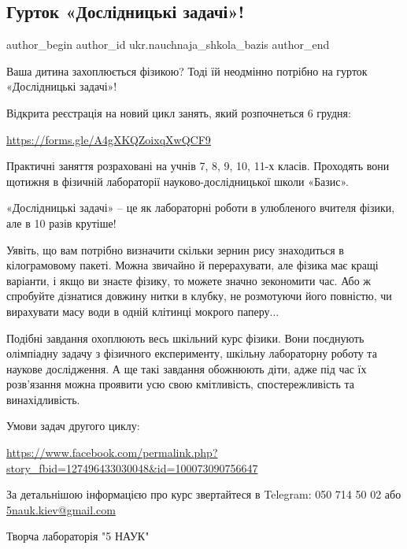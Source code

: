  
 
 
 
 
 
\subsection{Гурток «Дослідницькі задачі»!}
\label{sec:21_11_2021.fb.ukr.nauchnaja_shkola_bazis.1.gurtok_zadachi}
 
\ifcmt
 author_begin
   author_id ukr.nauchnaja_shkola_bazis
 author_end
\fi

Ваша дитина захоплюється фізикою? Тоді їй неодмінно потрібно на гурток
«Дослідницькі задачі»!

Відкрита реєстрація на новий цикл занять, який розпочнеться 6 грудня:

\url{https://forms.gle/A4gXKQZoixqXwQCF9}

Практичні заняття розраховані на учнів 7, 8, 9, 10, 11-х класів. Проходять вони
щотижня в фізичній лабораторії науково-дослідницької школи «Базис». 


«Дослідницькі задачі» – це як лабораторні роботи в улюбленого вчителя фізики,
але в 10 разів крутіше!

Уявіть, що вам потрібно визначити скільки зернин рису знаходиться в
кілограмовому пакеті. Можна звичайно й перерахувати, але фізика має кращі
варіанти, і якщо ви знаєте фізику, то можете значно зекономити час. Або ж
спробуйте дізнатися довжину нитки в клубку, не розмотуючи його повністю, чи
вирахувати масу води в одній клітинці мокрого паперу...

Подібні завдання охоплюють весь шкільний курс фізики. Вони поєднують олімпіадну
задачу з фізичного експерименту, шкільну лабораторну роботу та наукове
дослідження. А ще такі завдання обожнюють діти, адже під час їх розв’язання
можна проявити усю свою кмітливість, спостережливість та винахідливість. 

Умови задач другого циклу:

\url{https://www.facebook.com/permalink.php?story_fbid=127496433030048&id=100073090756647}

За детальнішою інформацією про курс звертайтеся в Telegram: 050 714 50 02 або
\url{5nauk.kiev@gmail.com}

Творча лабораторія "5 НАУК"
